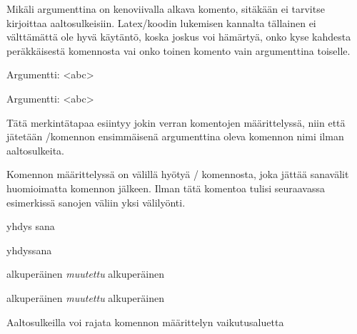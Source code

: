 \noindent
Mikäli argumenttina on kenoviivalla alkava komento, sitäkään ei tarvitse
kirjoittaa aaltosulkeisiin. Latex\-/koodin lukemisen kannalta tällainen
ei välttämättä ole hyvä käytäntö, koska joskus voi hämärtyä, onko kyse
kahdesta peräkkäisestä komennosta vai onko toinen komento vain
argumenttina toiselle.

\begin{koodilohkosis}
\newcommand{\x}[1]{Argumentti: <#1>}
\newcommand{\yyy}{abc}
\x\yyy
\end{koodilohkosis}

\begin{tulossis}
  Argumentti: <abc>
\end{tulossis}

\noindent
Tätä merkintätapaa esiintyy jokin verran komentojen määrittelyssä, niin
että jätetään \-/komennon ensimmäisenä argumenttina
oleva komennon nimi ilman aaltosulkeita.

\begin{koodilohkosis}
\newcommand\yyy{abc}
\end{koodilohkosis}

\noindent
Komennon määrittelyssä on välillä hyötyä \-/
komennosta, joka jättää sanavälit huomioimatta komennon jälkeen. Ilman
tätä komentoa tulisi seuraavassa esimerkissä sanojen väliin yksi
välilyönti.

\begin{koodilohkosis}
\newcommand{\komento}[1]{#1\ignorespaces}
\komento{yhdys}       sana
\end{koodilohkosis}

\begin{tulossis}
  yhdyssana
\end{tulossis}

\begin{esimerkki*}
\begin{koodilohko}
\newcommand{\komento}{alkuperäinen}
\komento
{%
  \renewcommand{\komento}{\textit{muutettu}}
  \komento
}
\komento
\end{koodilohko}
\begin{tulos}
  alkuperäinen \textit{muutettu} alkuperäinen
\end{tulos}
\caption{Aaltosulkeilla voi rajata komennon määrittelyn
  vaikutusaluetta}
\label{esim/aaltosulkeet-rajaaminen}
\end{esimerkki*}

